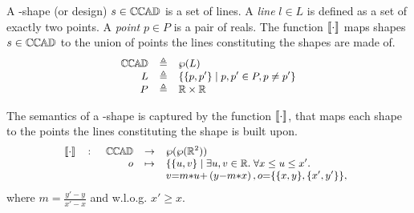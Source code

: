 
\begin{Definition} A \CCad-shape (or design) $s\in \mathbb{C}\mskip-1mu\mathbb{C}\mskip-1mu\mathbb{A}\mskip-1mu\mathbb{D} $ is a set of lines. 
A \emph{line} $l \in L$ is defined as a set of exactly two points.
A \emph{point} $p\in P$ is a pair of reals.
The function $\llbracket \cdot \rrbracket$ maps shapes $s\in \mathbb{C}\mskip-1mu\mathbb{C}\mskip-1mu\mathbb{A}\mskip-1mu\mathbb{D} $ to the union of points 
the lines constituting the shapes are made of.
\begin{displaymath}
   \begin{small}
      \begin{array}{rcl rcl}
         \CCAD &\eqdef& \wp(L) \\
         L     &\eqdef& \{ \{p, p'\} \;|\; p, p' \in P, p\neq p' \} \\
         P     &\eqdef& \mathbb{R} \times \mathbb{R}
      \end{array}
   \end{small}
\end{displaymath}

The semantics of a \CCad-shape is captured by the function 
$\llbracket \cdot \rrbracket$, that maps each shape to the points the lines constituting the 
shape is built upon. 
\begin{displaymath}
   \begin{small}
      \begin{array}{rcl}
         \SMapping & \colon & \!\!\!
            \begin{array}[t]{rcl}
               \CCAD &\to& \wp(\wp(\mathbb{R}^2)) \\
                   o &\mapsto& \lbrace \lbrace u,v\rbrace \;|\; \exists 
u,v\in \mathbb{R}.\; 
                    \forall x \leq u \leq x'. \\
& & v{=}m{*}u{+}\left(y{-}m{*}x\right), o{=}\lbrace \lbrace x, y \rbrace, \lbrace x', y' \rbrace \rbrace,
            \end{array}\\
      \end{array}
   \end{small}
\end{displaymath}
\noindent 
where $m = \frac{y'-y}{x'-x}$ and w.l.o.g. $x' \geq x$.
\end{Definition}

